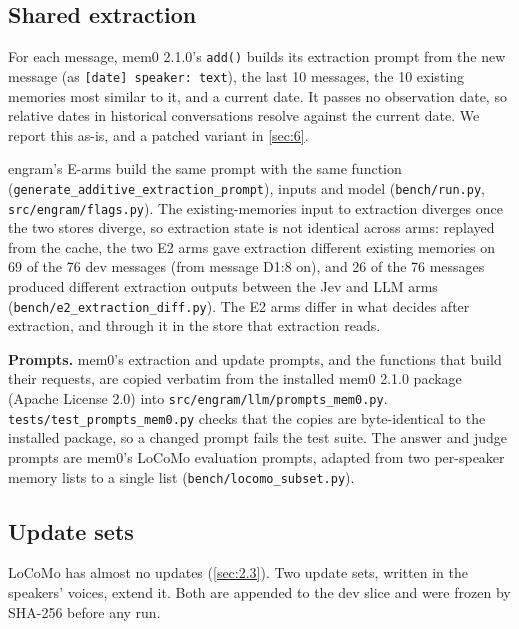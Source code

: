 \documentclass[11pt]{article}
\newcommand{\src}[1]{}
\begin{document}
\subsection{Shared extraction}\label{sec:4.2}
For each message, mem0 2.1.0's \texttt{add()} builds its extraction prompt from the new message (as \texttt{[date] speaker: text}), the last 10\src{src/engram/flags.py (extract\_last\_k, as mem0 2.1.0)} messages, the 10\src{src/engram/config.py} existing memories most similar to it, and a current date. It passes no observation date, so relative dates in historical conversations resolve against the current date. We report this as-is, and a patched variant in \cref{sec:6}.

engram's E-arms build the same prompt with the same function (\texttt{generate\_\allowbreak{}additive\_\allowbreak{}extraction\_\allowbreak{}prompt}), inputs and model (\texttt{bench/\allowbreak{}run.py}, \texttt{src/\allowbreak{}engram/\allowbreak{}flags.py}). The existing-memories input to extraction diverges once the two stores diverge, so extraction state is not identical across arms: replayed from the cache, the two E2 arms gave extraction different existing memories on 69\src{bench/results/e2\_extraction\_diff.json} of the 76\src{bench/results/e2\_extraction\_diff.json} dev messages (from message D1:8 on), and 26\src{bench/results/e2\_extraction\_diff.json} of the 76\src{bench/results/e2\_extraction\_diff.json} messages produced different extraction outputs between the Jev and LLM arms (\texttt{bench/\allowbreak{}e2\_\allowbreak{}extraction\_\allowbreak{}diff.py}). The E2 arms differ in what decides after extraction, and through it in the store that extraction reads.

\textbf{Prompts.} mem0's extraction and update prompts, and the functions that build their requests, are copied verbatim from the installed mem0 2.1.0 package (Apache License 2.0) into \texttt{src/\allowbreak{}engram/\allowbreak{}llm/\allowbreak{}prompts\_\allowbreak{}mem0.py}. \texttt{tests/\allowbreak{}test\_\allowbreak{}prompts\_\allowbreak{}mem0.py} checks that the copies are byte-identical to the installed package, so a changed prompt fails the test suite. The answer and judge prompts are mem0's LoCoMo evaluation prompts, adapted from two per-speaker memory lists to a single list (\texttt{bench/\allowbreak{}locomo\_\allowbreak{}subset.py}).

\subsection{Update sets}\label{sec:4.3}
LoCoMo has almost no updates (\cref{sec:2.3}). Two update sets, written in the speakers' voices, extend it. Both are appended to the dev slice and were frozen by SHA-256 before any run.
\end{document}
